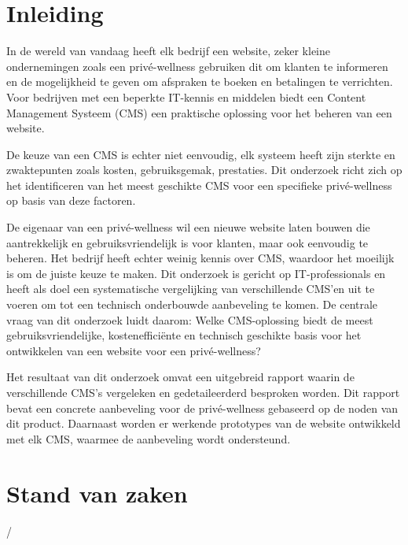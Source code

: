 
\section{Inleiding}%
\label{sec:inleiding}

In de wereld van vandaag heeft elk bedrijf een website, zeker kleine ondernemingen zoals een privé-wellness gebruiken dit om klanten te informeren en de mogelijkheid te geven om afspraken te boeken en betalingen te verrichten. Voor bedrijven met een beperkte IT-kennis en middelen biedt een Content Management Systeem (CMS) een praktische oplossing voor het beheren van een website.

De keuze van een CMS is echter niet eenvoudig, elk systeem heeft zijn sterkte en zwaktepunten zoals kosten, gebruiksgemak, prestaties. Dit onderzoek richt zich op het identificeren van het meest geschikte CMS voor een specifieke privé-wellness op basis van deze factoren.

De eigenaar van een privé-wellness wil een nieuwe website laten bouwen die aantrekkelijk en gebruiksvriendelijk is voor klanten, maar ook eenvoudig te beheren. Het bedrijf heeft echter weinig kennis over CMS, waardoor het moeilijk is om de juiste keuze te maken. Dit onderzoek is gericht op IT-professionals en heeft als doel een systematische vergelijking van verschillende CMS’en uit te voeren om tot een technisch onderbouwde aanbeveling te komen. De centrale vraag van dit onderzoek luidt daarom: Welke CMS-oplossing biedt de meest gebruiksvriendelijke, kostenefficiënte en technisch geschikte basis voor het ontwikkelen van een website voor een privé-wellness?

Het resultaat van dit onderzoek omvat een uitgebreid rapport waarin de verschillende CMS's vergeleken en gedetaileerderd besproken worden. Dit rapport bevat een concrete aanbeveling voor de privé-wellness gebaseerd op de noden van dit product. Daarnaast worden er werkende prototypes van de website ontwikkeld met elk CMS, waarmee de aanbeveling wordt ondersteund.


\section{Stand van zaken}%
\label{sec:Stand van zaken}

/

